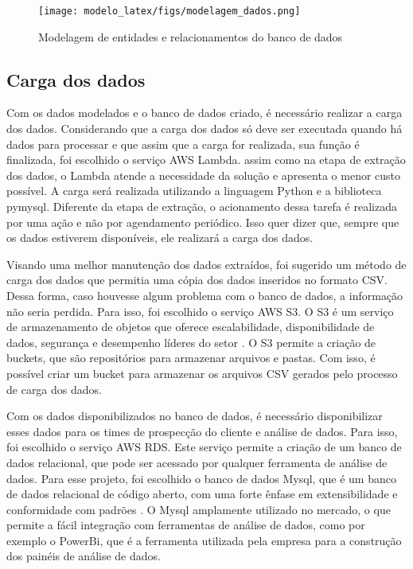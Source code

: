 \begin{figure}[H]
    \centering
    \texttt{[image: modelo\_latex/figs/modelagem\_dados.png]}
    \caption{Modelagem de entidades e relacionamentos do banco de dados}
    \label{fig:diagrama_er}
\end{figure}

\subsection{Carga dos dados}

Com os dados modelados e o banco de dados criado, é necessário realizar a carga dos dados. Considerando que a carga dos dados só deve ser executada quando há dados para processar e que assim que a carga for realizada, sua função é finalizada, foi escolhido o serviço AWS Lambda. assim como na etapa de extração dos dados, o Lambda atende a necessidade da solução e apresenta o menor custo possível. A carga será realizada utilizando a linguagem Python e a biblioteca pymysql. Diferente da etapa de extração, o acionamento dessa tarefa é realizada por uma ação e não por agendamento periódico. Isso quer dizer que, sempre que os dados estiverem disponíveis, ele realizará a carga dos dados.

Visando uma melhor manutenção dos dados extraídos, foi sugerido um método de carga dos dados que permitia uma cópia dos dados inseridos no formato CSV. Dessa forma, caso houvesse algum problema com o banco de dados, a informação não seria perdida. Para isso, foi escolhido o serviço AWS S3. O S3 é um serviço de armazenamento de objetos que oferece escalabilidade, disponibilidade de dados, segurança e desempenho líderes do setor \cite{S3}. O S3 permite a criação de buckets, que são repositórios para armazenar arquivos e pastas. Com isso, é possível criar um bucket para armazenar os arquivos CSV gerados pelo processo de carga dos dados.

Com os dados disponibilizados no banco de dados, é necessário disponibilizar esses dados para os times de prospecção do cliente e análise de dados. Para isso, foi escolhido o serviço AWS RDS. Este serviço permite a criação de um banco de dados relacional, que pode ser acessado por qualquer ferramenta de análise de dados. Para esse projeto, foi escolhido o banco de dados Mysql, que é um banco de dados relacional de código aberto, com uma forte ênfase em extensibilidade e conformidade com padrões \cite{MySQL}. O Mysql amplamente utilizado no mercado, o que permite a fácil integração com ferramentas de análise de dados, como por exemplo o PowerBi, que é a ferramenta utilizada pela empresa para a construção dos painéis de análise de dados.

